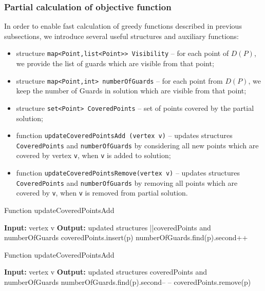 \documentclass[runningheads,a4paper]{elsarticle}
\begin{document}
	\subsubsection{Partial calculation of objective function}
	
	In order to enable fast calculation of greedy functions described in previous subsections, we introduce several useful structures and auxiliary functions:
	\begin{itemize}
		\item structure \texttt{map<Point,list<Point>> Visibility} -- for each point of $D(P)$, we provide the list of guards which are visible from that point; 
		\item structure \texttt{map<Point,int> numberOfGuards} -- for each point from $D(P)$,  we keep the number of Guards in solution which are visible from that point;
		\item structure \texttt{set<Point> CoveredPoints} -- set of points covered by the partial solution;
		\item function \texttt{updateCoveredPointsAdd (vertex v)} -- updates  structures \texttt{CoveredPoints} and \texttt{numberOfGuards} by considering all new points which are covered by vertex \texttt{v}, when \texttt{v} is added to solution;
		\item function \texttt{updateCoveredPointsRemove(vertex v)} -- updates  structures \texttt{CoveredPoints} and \texttt{numberOfGuards} by removing all points which are covered by \texttt{v}, when \texttt{v} is removed from partial solution.
	\end{itemize}
	\begin{algorithm}[!t]
          	\caption{Function updateCoveredPointsAdd}\label{alg:updateCoveredPointsAdd}
          	\begin{algorithmic}[1]
          		\State \textbf{Input:} vertex v
          		\State \textbf{Output:} updated structures ||coveredPoints and numberOfGuards
          		\State coveredPoints.insert(p)
          		\State numberOfGuards.find(p).second++
          		\EndFor
          	\end{algorithmic}
          \end{algorithm}
                    \begin{algorithm}[!t]
          	\caption{Function updateCoveredPointsAdd}\label{alg:updateCoveredPointsRemove}
          	\begin{algorithmic}[1]
          		\State \textbf{Input:} vertex v
          		\State \textbf{Output:} updated structures coveredPoints and numberOfGuards
          		\State numberOfGuards.find(p).second-- --
                    \State coveredPoints.remove(p)
                    \EndIf
          		\EndFor
          	\end{algorithmic}
          \end{algorithm}
	
\end{document}
